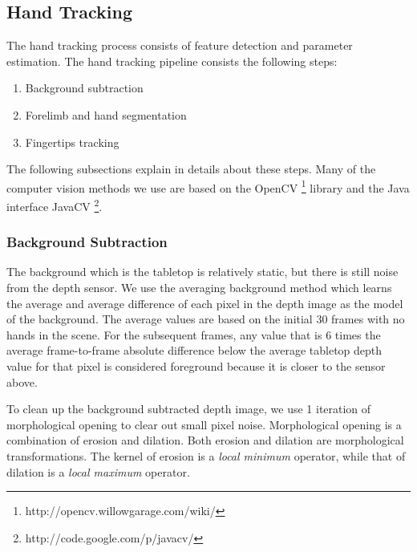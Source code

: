 \subsection{Hand Tracking}
The hand tracking process consists of feature detection and parameter estimation. The hand tracking
pipeline consists the following steps:

\begin{enumerate}
  \item Background subtraction
  \item Forelimb and hand segmentation
  \item Fingertips tracking
\end{enumerate}

The following subsections explain in details about these steps. Many of the
computer vision methods we use are based on the OpenCV
\footnote{http://opencv.willowgarage.com/wiki/} library and the Java interface 
JavaCV \footnote{http://code.google.com/p/javacv/}.

\subsubsection{Background Subtraction}
The background which is the tabletop is relatively static, but there is still 
noise from the depth sensor. We use the averaging background method which
learns the average and average difference of each pixel in the depth image as
the model of the background. The average values are based on the initial 30
frames with no hands in the scene. For the subsequent frames, any value that is 
6 times the average frame-to-frame absolute difference below the average tabletop depth value for that pixel is considered 
foreground because it is closer to the sensor above.

To clean up the background subtracted depth image, we use 1 iteration of
morphological opening to clear out small pixel noise. Morphological opening is a
combination of erosion and dilation. Both erosion and dilation are morphological
transformations. The kernel of erosion is a \textit{local minimum} operator,
while that of dilation is a \textit{local maximum} operator.


